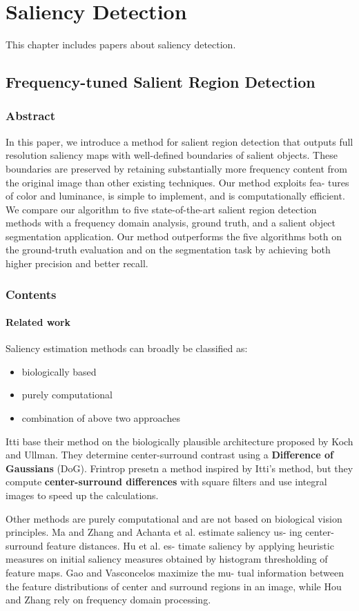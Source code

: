 \chapter{Saliency Detection}
This chapter includes papers about saliency detection.
\section{Frequency-tuned Salient Region Detection}
\subsection{Abstract}
In this paper, we introduce a method for salient region detection that outputs full resolution saliency maps with well-defined boundaries of salient
objects. These boundaries are preserved by retaining substantially more frequency content from the original image than other existing techniques. Our method exploits fea-
tures of color and luminance, is simple to implement, and is computationally efficient. We compare our algorithm to five
state-of-the-art salient region detection methods with a frequency domain analysis, ground truth, and a salient object segmentation application. Our method outperforms the five algorithms both on the ground-truth evaluation and on the segmentation task by achieving both higher precision and better recall.
\subsection{Contents}
\subsubsection{Related work}
Saliency estimation methods can broadly be classified as:
\begin{itemize}
\item biologically based
\item purely computational 
\item combination of above two approaches
\end{itemize}

Itti base their method on the biologically plausible architecture proposed by Koch and Ullman. They determine center-surround contrast using a \textbf{Difference of Gaussians}
(DoG). Frintrop presetn a method inspired by Itti's method, but they compute \textbf{center-surround differences} with square filters and use integral images to speed up the calculations.

Other methods are purely computational 
and are not based on biological vision principles. Ma and
Zhang  and Achanta et al. estimate saliency us-
ing center-surround feature distances. Hu et al.  es-
timate saliency by applying heuristic measures on initial
saliency measures obtained by histogram thresholding of
feature maps. Gao and Vasconcelos maximize the mu-
tual information between the feature distributions of center
and surround regions in an image, while Hou and Zhang
 rely on frequency domain processing.
 
